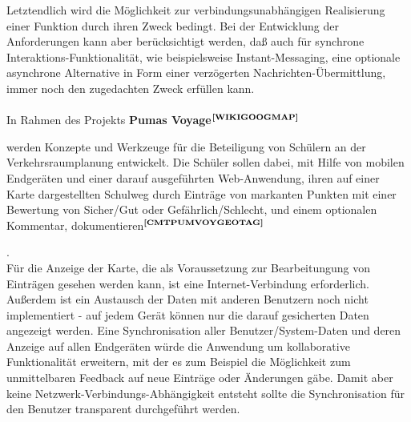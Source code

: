 \noindent
Letztendlich wird die Möglichkeit zur verbindungsunabhängigen Realisierung einer Funktion durch ihren Zweck bedingt. Bei der Entwicklung der Anforderungen kann aber berücksichtigt werden, daß auch für synchrone Interaktions-Funktionalität, wie beispielsweise Instant-Messaging, eine optionale asynchrone Alternative in Form einer verzögerten Nachrichten-Übermittlung, immer noch den zugedachten Zweck erfüllen kann.\\ \\
\noindent
In Rahmen des Projekts \textbf{Pumas Voyage}$^{\textbf{\ref{WIKIGOOGMAP}}}$%
\addtocounter{footnote}{1}%
 werden Konzepte und Werkzeuge für die Beteiligung von Schülern an der Verkehrsraumplanung entwickelt. Die Schüler sollen dabei, mit Hilfe von mobilen Endgeräten und einer darauf ausgeführten Web-Anwendung, ihren auf einer Karte dargestellten Schulweg durch Einträge von markanten Punkten mit einer Bewertung von Sicher/Gut oder Gefährlich/Schlecht, und einem optionalen Kommentar, dokumentieren$^{\textbf{\ref{CMTPUMVOYGEOTAG}}}$%
\addtocounter{footnote}{1}%
.\\
Für die Anzeige der Karte, die als Voraussetzung zur Bearbeitungung von Einträgen gesehen werden kann, ist eine Internet-Verbindung erforderlich. Außerdem ist ein Austausch der Daten mit anderen Benutzern noch nicht implementiert - auf jedem Gerät können nur die darauf gesicherten Daten angezeigt werden. Eine Synchronisation aller Benutzer/System-Daten und deren Anzeige auf allen Endgeräten würde die Anwendung um kollaborative Funktionalität erweitern, mit der es zum Beispiel die Möglichkeit zum unmittelbaren Feedback auf neue Einträge oder Änderungen gäbe. Damit aber keine Netzwerk-Verbindungs-Abhängigkeit entsteht sollte die Synchronisation für den Benutzer transparent durchgeführt werden.\\ \\
